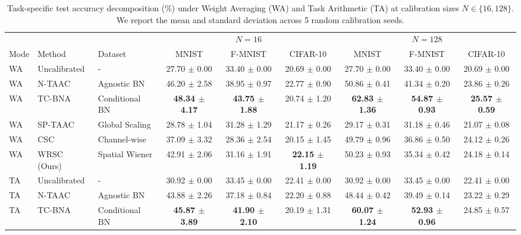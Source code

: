 \documentclass{article}
\theoremstyle{plain}
\theoremstyle{definition}
\theoremstyle{remark}
\begin{document}
\begin{table}[t]
\caption{Task-specific test accuracy decomposition (\%) under Weight Averaging (WA) and Task Arithmetic (TA) at calibration sizes $N \in \{16, 128\}$. We report the mean and standard deviation across 5 random calibration seeds.}
\label{tab:task_results}
\vskip 0.15in
\begin{center}
\begin{scriptsize}
\begin{sc}
\setlength{\tabcolsep}{2.5pt}
\begin{tabular}{lllcccccc}
\toprule
& & & \multicolumn{3}{c}{$N=16$} & \multicolumn{3}{c}{$N=128$} \\
\cmidrule(r){4-6} \cmidrule(l){7-9}
Mode & Method & Dataset & MNIST & F-MNIST & CIFAR-10 & MNIST & F-MNIST & CIFAR-10 \\
\midrule
WA & Uncalibrated & - & 27.70 $\pm$ 0.00 & 33.40 $\pm$ 0.00 & 20.69 $\pm$ 0.00 & 27.70 $\pm$ 0.00 & 33.40 $\pm$ 0.00 & 20.69 $\pm$ 0.00 \\
WA & N-TAAC & Agnostic BN & 46.20 $\pm$ 2.58 & 38.95 $\pm$ 0.97 & 22.77 $\pm$ 0.90 & 50.86 $\pm$ 0.41 & 41.34 $\pm$ 0.20 & 23.86 $\pm$ 0.26 \\
WA & TC-BNA & Conditional BN & \textbf{48.34 $\pm$ 4.17} & \textbf{43.75 $\pm$ 1.88} & 20.74 $\pm$ 1.20 & \textbf{62.83 $\pm$ 1.36} & \textbf{54.87 $\pm$ 0.93} & \textbf{25.57 $\pm$ 0.59} \\
WA & SP-TAAC & Global Scaling & 28.78 $\pm$ 1.04 & 31.28 $\pm$ 1.29 & 21.17 $\pm$ 0.26 & 29.17 $\pm$ 0.31 & 31.18 $\pm$ 0.46 & 21.07 $\pm$ 0.08 \\
WA & CSC & Channel-wise & 37.09 $\pm$ 3.32 & 28.36 $\pm$ 2.54 & 20.15 $\pm$ 1.45 & 49.79 $\pm$ 0.96 & 36.86 $\pm$ 0.50 & 24.12 $\pm$ 0.26 \\
WA & WRSC (Ours) & Spatial Wiener & 42.91 $\pm$ 2.06 & 31.16 $\pm$ 1.91 & \textbf{22.15 $\pm$ 1.19} & 50.23 $\pm$ 0.93 & 35.34 $\pm$ 0.42 & 24.18 $\pm$ 0.14 \\
\midrule
TA & Uncalibrated & - & 30.92 $\pm$ 0.00 & 33.45 $\pm$ 0.00 & 22.41 $\pm$ 0.00 & 30.92 $\pm$ 0.00 & 33.45 $\pm$ 0.00 & 22.41 $\pm$ 0.00 \\
TA & N-TAAC & Agnostic BN & 43.88 $\pm$ 2.26 & 37.18 $\pm$ 0.84 & 22.20 $\pm$ 0.88 & 48.44 $\pm$ 0.42 & 39.49 $\pm$ 0.14 & 23.22 $\pm$ 0.29 \\
TA & TC-BNA & Conditional BN & \textbf{45.87 $\pm$ 3.89} & \textbf{41.90 $\pm$ 2.10} & 20.19 $\pm$ 1.31 & \textbf{60.07 $\pm$ 1.24} & \textbf{52.93 $\pm$ 0.96} & 24.85 $\pm$ 0.57 \\

\end{tabular}
\end{sc}
\end{scriptsize}
\end{center}
\end{table}
\end{document}
